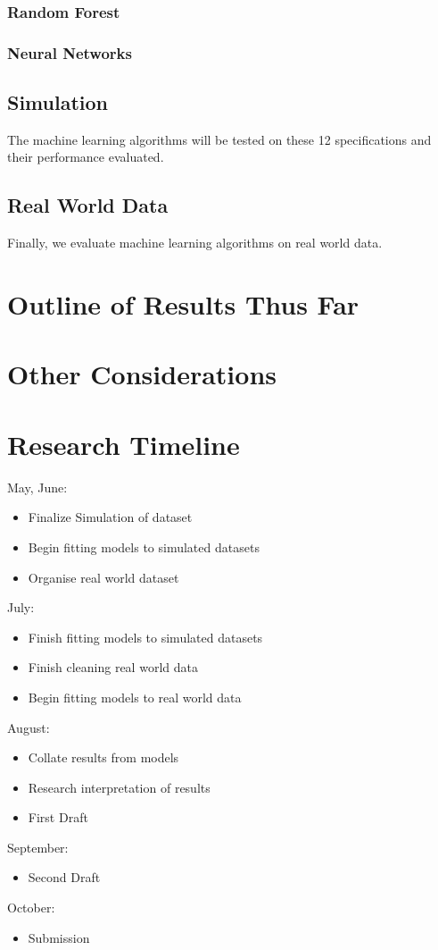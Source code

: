\documentclass[a4paper]{article}
\begin{document}
\subsubsection{Random Forest}

\subsubsection{Neural Networks}

\subsection{Simulation}

The machine learning algorithms will be tested on these 12 specifications and their performance evaluated.

\subsection{Real World Data}

Finally, we evaluate machine learning algorithms on real world data. 

\section{Outline of Results Thus Far}

\section{Other Considerations}



\section{Research Timeline}

May, June:
\begin{itemize}
	\item Finalize Simulation of dataset
	\item Begin fitting models to simulated datasets
	\item Organise real world dataset
\end{itemize}

July:
\begin{itemize}
	\item Finish fitting models to simulated datasets
	\item Finish cleaning real world data
	\item Begin fitting models to real world data
\end{itemize}

August:
\begin{itemize}
	\item Collate results from models
	\item Research interpretation of results
	\item First Draft
\end{itemize}

September:
\begin{itemize}
	\item Second Draft
\end{itemize}

October:
\begin{itemize}
	\item Submission
\end{itemize}
\end{document}
